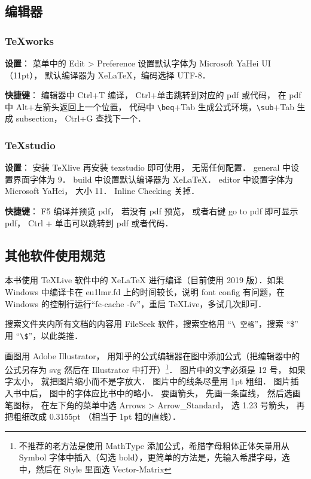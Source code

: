 
\subsection{编辑器}

\subsubsection{TeXworks}

\textbf{设置}： 菜单中的 Edit > Preference 设置默认字体为 Microsoft YaHei UI（11pt）， 默认编译器为 XeLaTeX，编码选择 UTF-8．

\textbf{快捷键}：
编辑器中 Ctrl+T 编译， 
Ctrl+单击跳转到对应的 pdf 或代码， 
在 pdf 中 Alt+左箭头返回上一个位置， 
代码中 \verb|\beq|+Tab 生成公式环境，\verb|\sub|+Tab 生成 subsection， Ctrl+G 查找下一个．

\subsubsection{TeXstudio}
\textbf{设置}： 安装 TeXlive 再安装 texstudio 即可使用， 无需任何配置．
general 中设置界面字体为 9．
build 中设置默认编译器为 XeLaTeX．
editor 中设置字体为 Microsoft YaHei， 大小 11．
Inline Checking 关掉．

\textbf{快捷键}：
F5 编译并预览 pdf， 若没有 pdf 预览， 或者右键 go to pdf 即可显示 pdf， Ctrl + 单击可以跳转到 pdf 或者代码．

\subsection{其他软件使用规范}
本书使用 TeXLive 软件中的 XeLaTeX 进行编译（目前使用 2019 版）．如果 Windows 中编译卡在 eu1lmr.fd 上的时间较长，说明 font config 有问题，在 Windows 的控制行运行“fc-cache -fv”，重启 TeXLive，多试几次即可．

搜索文件夹内所有文档的内容用 FileSeek 软件，搜索空格用 “\verb|\ 空格|”，搜索 “\$” 用 “\verb|\$|”，以此类推．

画图用 Adobe Illustrator， 用知乎的公式编辑器在图中添加公式（把编辑器中的公式另存为 svg 然后在 Illustrator 中打开）\footnote{不推荐的老方法是使用 MathType 添加公式，希腊字母粗体正体矢量用从 Symbol 字体中插入（勾选 bold），更简单的方法是，先输入希腊字母，选中，然后在 Style 里面选 Vector-Matrix}． 图片中的文字必须是 12 号， 如果字太小， 就把图片缩小而不是字放大． 图片中的线条尽量用 1pt 粗细． 图片插入书中后， 图中的字体应比书中的略小． 要画箭头， 先画一条直线， 然后选画笔图标， 在左下角的菜单中选 Arrows > Arrow\_Standard， 选 1.23 号箭头， 再把粗细改成 0.3155pt （相当于 1pt 粗的直线）．

